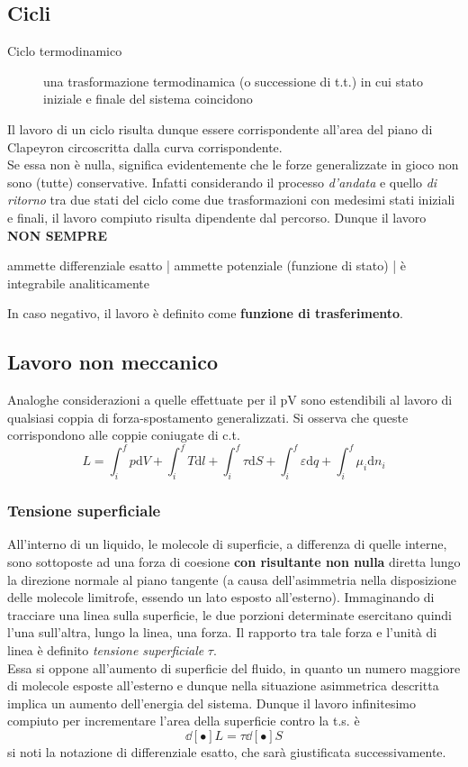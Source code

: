 \documentclass[10pt, oneside]{book}
\begin{document}
\subsection{Cicli}
\begin{description}
\item[Ciclo termodinamico] una trasformazione termodinamica (o successione di t.t.) in cui stato iniziale e finale del sistema coincidono
\end{description}
Il lavoro di un ciclo risulta dunque essere corrispondente all'area del piano di Clapeyron circoscritta dalla curva corrispondente.\\
Se essa non è nulla, significa evidentemente che le forze generalizzate in gioco non sono (tutte) conservative. Infatti considerando il processo \textit{d'andata} e quello \textit{di ritorno} tra due stati del ciclo come due trasformazioni con medesimi stati iniziali e finali, il lavoro compiuto risulta dipendente dal percorso. Dunque il lavoro \textbf{NON SEMPRE}
\begin{center}ammette differenziale esatto | ammette potenziale (funzione di stato) | è integrabile analiticamente \end{center}
In caso negativo, il lavoro è definito come \textbf{funzione di trasferimento}.

\subsection{Lavoro non meccanico}
Analoghe considerazioni a quelle effettuate per il pV sono estendibili al lavoro di qualsiasi coppia di forza-spostamento generalizzati. Si osserva che queste corrispondono alle coppie coniugate di c.t.
\[ L = \int_{i}^{f}p\mathrm{d}V + \int_{i}^{f}T \mathrm{d}l + \int_{i}^{f}\tau \mathrm{d}S + \int_{i}^{f}\varepsilon \mathrm{d}q + \int_{i}^{f}\mu_i \mathrm{d}n_i\]

\subsubsection{Tensione superficiale}
All'interno di un liquido, le molecole di superficie, a differenza di quelle interne, sono sottoposte ad una forza di coesione \textbf{con risultante non nulla} diretta lungo la direzione normale al piano tangente (a causa dell'asimmetria nella disposizione delle molecole limitrofe, essendo un lato esposto all'esterno). Immaginando di tracciare una linea sulla superficie, le due porzioni determinate esercitano quindi l'una sull'altra, lungo la linea, una forza. Il rapporto tra tale forza e l'unità di linea è definito \textit{tensione superficiale} $\tau$.\\
Essa si oppone all'aumento di superficie del fluido, in quanto un numero maggiore di molecole esposte all'esterno e dunque nella situazione asimmetrica descritta implica un aumento dell'energia del sistema. Dunque il lavoro infinitesimo compiuto per incrementare l'area della superficie contro la t.s. è
\[\dd[•]{L} = \tau \dd[•]{S}\]
si noti la notazione di differenziale esatto, che sarà giustificata successivamente.
\end{document}
